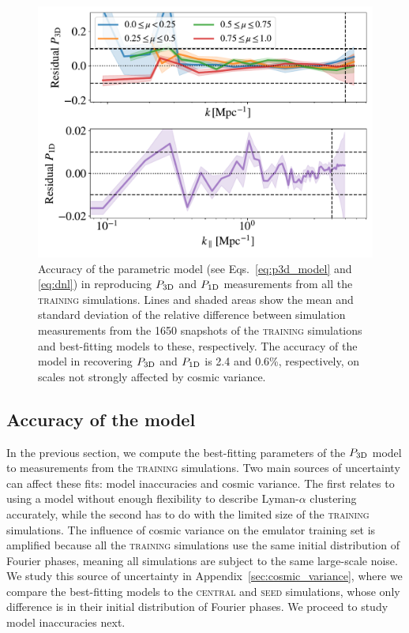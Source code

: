 \documentclass[longauth]{aa}
\newcommand{\lya}{Lyman-$\alpha$\xspace}
\newcommand{\poned}{\ensuremath{P_{\rm 1D}}\xspace}
\newcommand{\pthreed}{\ensuremath{P_{\rm 3D}}\xspace}
\newcommand{\lacehc}{\textsc{training}\xspace}
\newcommand{\simseed}{\textsc{seed}\xspace}
\newcommand{\simcentral}{\textsc{central}\xspace}
\begin{document}
\begin{figure}
\includegraphics[width=\columnwidth]{figures/goodness_fit_all.pdf}
\centering
\caption{Accuracy of the parametric model (see Eqs.~\ref{eq:p3d_model} and \ref{eq:dnl}) in reproducing \pthreed and \poned measurements from all the \lacehc simulations. Lines and shaded areas show the mean and standard deviation of the relative difference between simulation measurements from the 1650 snapshots of the \lacehc simulations and best-fitting models to these, respectively. The accuracy of the model in recovering \pthreed and \poned is 2.4 and 0.6\%, respectively, on scales not strongly affected by cosmic variance.}
\label{fig:goodness}
\end{figure}

\subsection{Accuracy of the model}
\label{sec:input_precision}

In the previous section, we compute the best-fitting parameters of the \pthreed model to measurements from the \lacehc simulations. Two main sources of uncertainty can affect these fits: model inaccuracies and cosmic variance. The first relates to using a model without enough flexibility to describe \lya clustering accurately, while the second has to do with the limited size of the \lacehc simulations. The influence of cosmic variance on the emulator training set is amplified because all the \lacehc simulations use the same initial distribution of Fourier phases, meaning all simulations are subject to the same large-scale noise. We study this source of uncertainty in Appendix~\ref{sec:cosmic_variance}, where we compare the best-fitting models to the \simcentral and \simseed simulations, whose only difference is in their initial distribution of Fourier phases. We proceed to study model inaccuracies next.
\end{document}
